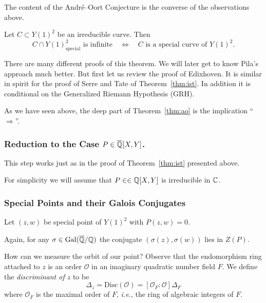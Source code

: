 The content of the Andr\'e--Oort Conjecture is the converse of the
observations above.

\begin{theorem}
  \label{thm:ao}
  Let $C\subset Y(1)^2$ be an irreducible curve. Then
  \begin{equation*}
    C \cap Y(1)^2_{\mathrm{special}}\text{ is
      infinite}\quad\Longleftrightarrow\quad \text{$C$ is a special
      curve of $Y(1)^2$}. 
  \end{equation*}  
\end{theorem}

There are many different proofs of this theorem. We will later get to
know Pila's approach much better. But first let us review the proof of
Edixhoven. It is similar in spirit for the proof of Serre and Tate of
Theorem~\ref{thm:ist}. In addition it is conditional on the Generalized
Riemann Hypothesis (GRH).

As we have seen above, the deep part of Theorem~\ref{thm:ao} is the
implication
``$\Longrightarrow$''.

\subsubsection{Reduction to the Case $P \in {\overline{\mathbb{Q}}}[X,Y]$.}
This step works just as in the proof of Theorem~\ref{thm:ist}
presented above.

For simplicity we will assume that $P\in \in{\mathbb{Q}}[X,Y]$ is irreducible
in ${\mathbb{C}}$. 

\subsubsection{Special Points and their Galois Conjugates}

Let $(z,w)$ be special point of $Y(1)^2$ with $P(z,w)=0$.

Again, for any $\sigma\in \mathrm{Gal}({\overline{\mathbb{Q}}}/{\mathbb{Q}})$ the conjugate
$(\sigma(z),\sigma(w))$ lies in $Z(P)$.

How can we measure the orbit of our point? Observe that the
endomorphism ring attached to $z$ is an order $\mathcal{O}$ in an imaginary
quadratic number field $F$. We define the \emph{discriminant of $z$}
to be 
\begin{equation*}
  \Delta_z = \mathrm{Disc}(\mathcal{O}) = [\mathcal{O}_F:\mathcal{O}] \Delta_F
\end{equation*}
where $\mathcal{O}_F$ is the maximal order of $F$, \textit{i.e.}, the
ring of algebraic integers of $F$. 

